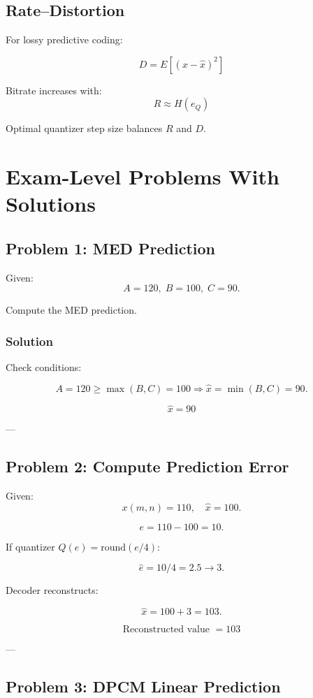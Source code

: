 \documentclass{AnantDocumentation}
\begin{document}
\subsection{Rate--Distortion}

For lossy predictive coding:

\[
D = E[(x - \hat{x})^2]
\]

Bitrate increases with:
\[
R \approx H(e_Q)
\]

Optimal quantizer step size balances $R$ and $D$.

\newpage
\section*{Exam-Level Problems With Solutions}

\subsection*{Problem 1: MED Prediction}

Given:
\[
A=120,\; B=100,\; C=90.
\]

Compute the MED prediction.

\subsubsection*{Solution}

Check conditions:

\[
A = 120 \ge \max(B,C) = 100 \Rightarrow \hat{x} = \min(B,C) = 90.
\]

\[
\boxed{\hat{x} = 90}
\]

---

\subsection*{Problem 2: Compute Prediction Error}

Given:
\[
x(m,n)=110,\quad \hat{x}=100.
\]

\[
e = 110 - 100 = 10.
\]

If quantizer $Q(e) = \text{round}(e/4)$:

\[
\hat{e}= 10/4 = 2.5 \rightarrow 3.
\]

Decoder reconstructs:

\[
\hat{x} = 100 + 3 = 103.
\]

\[
\boxed{\text{Reconstructed value } = 103}
\]

---

\subsection*{Problem 3: DPCM Linear Prediction}
\end{document}
